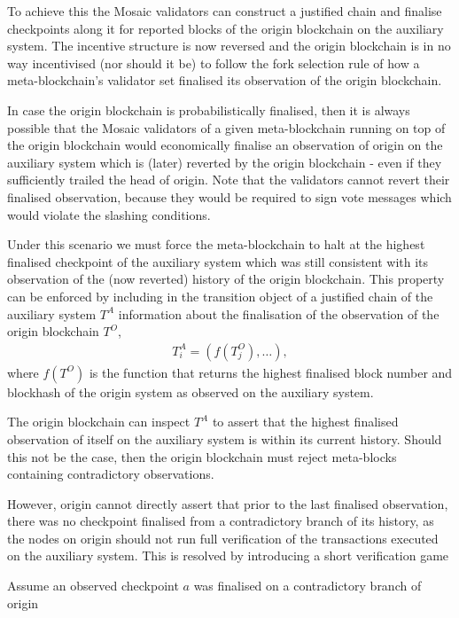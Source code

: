 \documentclass[12pt,a4paper]{article}
\begin{document}
To achieve this the Mosaic validators can construct a justified chain and finalise checkpoints along it for reported blocks of the origin blockchain on the auxiliary system. The incentive structure is now reversed and the origin blockchain is in no way incentivised (nor should it be) to follow the fork selection rule of how a meta-blockchain's validator set finalised its observation of the origin blockchain.

In case the origin blockchain is probabilistically finalised, then it is always possible that the Mosaic validators of a given meta-blockchain running on top of the origin blockchain would economically finalise an observation of origin on the auxiliary system which is (later) reverted by the origin blockchain - even if they sufficiently trailed the head of origin. Note that the validators cannot revert their finalised observation, because they would be required to sign vote messages which would violate the slashing conditions.

Under this scenario we must force the meta-blockchain to halt at the highest finalised checkpoint of the auxiliary system which was still consistent with its observation of the (now reverted) history of the origin blockchain.  This property can be enforced by including in the transition object of a justified chain of the auxiliary system $T^A$ information about the finalisation of the observation of the origin blockchain $T^O$,
\begin{align*}
  T^A_i = (f(T^O_j), \dots),
\end{align*}
where $f(T^O)$ is the function that returns the highest finalised block number and blockhash of the origin system as observed on the auxiliary system.

The origin blockchain can inspect $T^A$ to assert that the highest finalised observation of itself on the auxiliary system is within its current history.  Should this not be the case, then the origin blockchain must reject meta-blocks containing contradictory observations.

However, origin cannot directly assert that prior to the last finalised observation, there was no checkpoint finalised from a contradictory branch of its history, as the nodes on origin should not run full verification of the transactions executed on the auxiliary system. This is resolved by introducing a short verification game

Assume an observed checkpoint $a$ was finalised on a contradictory branch of origin
\end{document}
